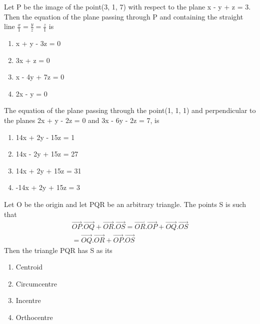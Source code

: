 \item Let P be the image of the point(3, 1, 7) with respect to the plane x - y + z = 3. Then the equation of the plane passing through P and containing the straight line $\frac{x}{1} = \frac{y}{z} = \frac{z}{1}$ is
\begin{enumerate}
\item x + y - 3z = 0
\item 3x + z = 0
\item x - 4y + 7z = 0
\item 2x - y = 0
\end{enumerate}

\item The equation of the plane passing through the point(1, 1, 1) and perpendicular to the planes 2x + y - 2z = 0 and 3x - 6y - 2z = 7, is
\begin{enumerate}
\item 14x + 2y - 15z = 1
\item 14x - 2y + 15z = 27
\item 14x + 2y + 15z = 31
\item -14x + 2y + 15z = 3
\end{enumerate}

\item Let O be the origin and let PQR be an arbitrary triangle. The points S is such that
\begin{align*}
\overrightarrow{OP}.\overrightarrow{OQ} + \overrightarrow{OR}.\overrightarrow{OS} = \overrightarrow{OR}.\overrightarrow{OP} + \overrightarrow{OQ}.\overrightarrow{OS}\\
 = \overrightarrow{OQ}.\overrightarrow{OR} + \overrightarrow{OP}.\overrightarrow{OS}
\end{align*}
Then the triangle PQR has S as its
\begin{enumerate}
\item Centroid
\item Circumcentre
\item Incentre
\item Orthocentre
\end{enumerate}

